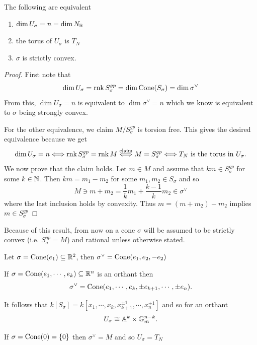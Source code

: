\begin{proposition}
The following are equivalent
\begin{enumerate}
\item $\dim U_\sigma=n=\dim N_{\mathbb{R}}$
\item the torus of $U_\sigma$ is $T_N$
\item $\sigma$ is strictly convex.
\end{enumerate}
\end{proposition}
\begin{proof}
First note that 
\[\dim U_\sigma=\operatorname{rnk} S^{gp}_\sigma=\dim \operatorname{Cone}(S_\sigma)=\dim\sigma^\vee\]
From this, $\dim U_\sigma=n$ is equivalent to $\dim \sigma^\vee=n$ which we know is equivalent to $\sigma$ being strongly convex.

For the other equivalence, we claim $M/S^{gp}_\sigma$ is torsion free. This gives the desired equivalence because we get
\[\dim U_\sigma=n\Longleftrightarrow\operatorname{rnk} S^{gp}_\sigma=\operatorname{rnk} M\overset{\text{claim}}{\Longleftrightarrow} M=S_\sigma^{gp}\Longleftrightarrow T_N\text{ is the torus in }U_\sigma.\] 
We now prove that the claim holds. Let $m\in M$ and assume that $km\in S^{gp}_\sigma$ for some $k\in \mathbb{N}$. Then $km=m_1-m_2$ for some $m_1,m_2\in S_\sigma$ and so
\[M\ni m+m_2=\frac1k m_1+\frac{k-1}km_2\in \sigma^\vee\]
where the last inclusion holds by convexity. Thus $m=(m+m_2)-m_2$ implies $m\in S^{gp}_\sigma$
\end{proof}

\begin{center}
	Because of this result, from now on a cone $\sigma$ will be assumed to be strictly convex (i.e. $S_\sigma^{gp}=M$) and rational unless otherwise stated.
\end{center}




\begin{example}
Let $\sigma=\operatorname{Cone}(e_1)\subseteq \mathbb{R}^2$, then $\sigma^\vee=\operatorname{Cone}(e_1,e_2,-e_2)$
\end{example}

\begin{example}
If $\sigma=\operatorname{Cone}(e_1,\cdots, e_k)\subseteq \mathbb{R}^n$ is an orthant then 
\[\sigma^\vee=\operatorname{Cone}(e_1,\cdots, e_k, \pm e_{k+1},\cdots, \pm e_n).\]

It follows that $k[S_\sigma]=k[x_1,\cdots, x_k,x_{k+1}^{\pm1},\cdots,x_n^{\pm1}]$ and so for an orthant
\[U_\sigma\cong \mathbb{A}^k\times \mathbb{G}_m^{n-k}.\]
\end{example}

\begin{example}
If $\sigma=\operatorname{Cone}(0)=\left\{{0}\right\}$ then $\sigma^\vee=M$ and so $U_\sigma=T_N$
\end{example}

